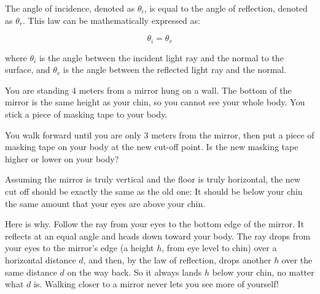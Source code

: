 \begin{mdframed}[style=important, frametitle={Law of Reflection}]
  The angle of incidence, denoted as $\theta_i$, is equal to
  the angle of reflection, denoted as $\theta_r$. This law can be
  mathematically expressed as:

  $$\theta_i = \theta_r$$

  where $\theta_i$ is the angle between the incident light ray and the
  normal to the surface, and $\theta_r$ is the angle between the
  reflected light ray and the normal.



\end{mdframed}

\begin{Exercise}[title={Law of Reflection}, label=law_of_reflection]

  You are standing 4 meters from a mirror hung on a wall. The bottom
  of the mirror is the same height as your chin, so you cannot see your
  whole body. You stick a piece of masking tape to your body.

  You walk forward until you are only 3 meters from the mirror, then
  put a piece of masking tape on your body at the new cut-off point. Is the new
  masking tape higher or lower on your body?

\end{Exercise}
\begin{Answer}[ref=law_of_reflection]

  Assuming the mirror is truly vertical and the floor is truly
  horizontal, the new cut off should be exactly the same as the old
  one: It should be below your chin the same amount that your eyes are
  above your chin.

  Here is why. Follow the ray from your eyes to the bottom edge of the
  mirror. It reflects at an equal angle and heads down toward your body.
  The ray drops from your eyes to the mirror's edge (a height $h$, from eye
  level to chin) over a horizontal distance $d$, and then, by the law of
  reflection, drops another $h$ over the same distance $d$ on the way
  back. So it always lands $h$ below your chin, no matter what $d$ is.
  Walking closer to a mirror never lets you see more of yourself!

\end{Answer}


